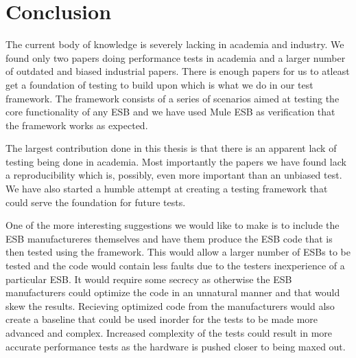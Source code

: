 \section{Conclusion}

The current body of knowledge is severely lacking in academia and industry. We found only two papers doing performance tests in academia and a larger number of outdated and biased industrial papers.
There is enough papers for us to atleast get a foundation of testing to build upon which is what we do in our test framework. The framework consists of a series of scenarios aimed at testing the core functionality of any ESB and we have used Mule ESB as verification that the framework works as expected. 


The largest contribution done in this thesis is that there is an apparent lack of testing being done in academia. 
Most importantly the papers we have found \cite{Sanjay2011} lack a reproducibility which is, possibly, even more important than an unbiased test. 
We have also started a humble attempt at creating a testing framework that could serve the foundation for future tests. 

One of the more interesting suggestions we would like to make is to include the ESB manufactureres themselves and have them produce the ESB code that is then tested using the framework. 
This would allow a larger number of ESBs to be tested and the code would contain less faults due to the testers inexperience of a particular ESB. 
It would require some secrecy as otherwise the ESB manufacturers could optimize the code in an unnatural manner and that would skew the results. 
Recieving optimized code from the manufacturers would also create a baseline that could be used inorder for the tests to be made more advanced and complex.
Increased complexity of the tests could result in more accurate performance tests as the hardware is pushed closer to being maxed out.